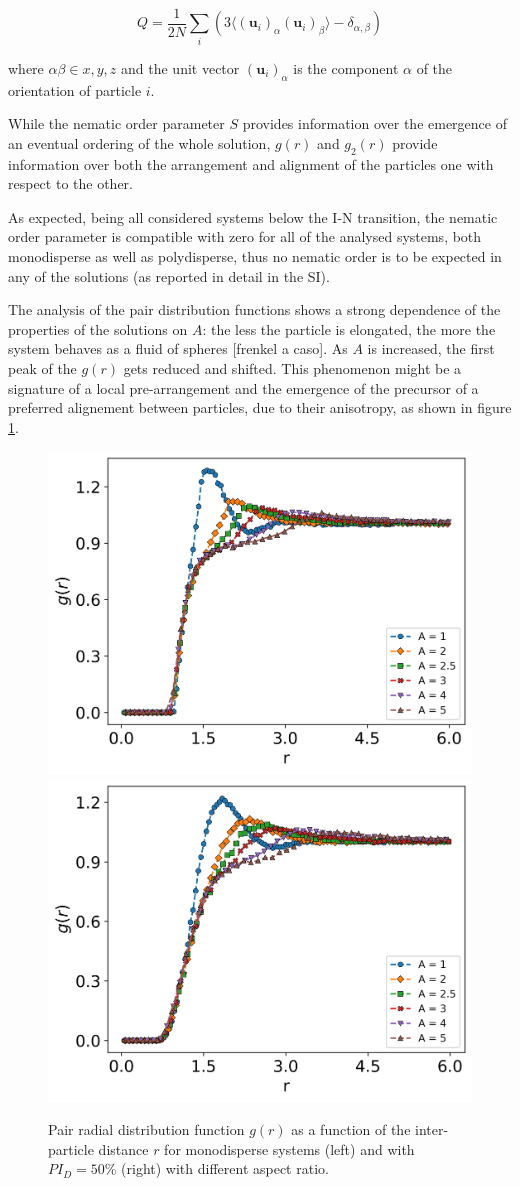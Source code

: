 \documentclass[journal=jacsat,manuscript=article]{achemso}
\begin{document}
$$Q = \frac{1}{2 N} \sum_i \left( 3 \langle (\textbf{u}_i)_\alpha (\textbf{u}_i)_\beta \rangle - \delta_{\alpha, \beta} \right)$$

where $\alpha \beta \in {x, y, z}$ and the unit vector $(\textbf{u}_i)_\alpha$ is the component $\alpha$ of the orientation of particle $i$.

While the nematic order parameter $S$ provides information over the emergence of an eventual ordering of the whole solution, $g(r)$ and $g_2(r)$ provide information over both the  arrangement and  alignment of the particles one with respect to the other. 

As expected, being all considered systems below the I-N transition, the nematic order parameter  is compatible with zero for all of the analysed systems, both monodisperse as well as polydisperse, thus no nematic order is to be expected in any of the solutions (as reported in detail in the SI).


The analysis of the pair distribution functions shows a strong dependence  of the properties of the solutions on $A$: the less the particle is elongated, the more the system behaves as a fluid of spheres [frenkel a caso]. As $A$ is increased, the first peak of the $g(r)$ gets reduced and shifted. This phenomenon might be a signature of a local pre-arrangement and the emergence of  the precursor of a preferred alignement between particles, due to their anisotropy, as shown in figure \ref{fig:G_Monodisperse}. 

\begin{figure}[!h]
    \centering
    \includegraphics[width=0.45 \columnwidth]{Figures/G_mono.png}
    \includegraphics[width=0.45 \columnwidth]{Figures/G_polyD.png}
    \caption{Pair radial distribution function $g(r)$ as a function of the inter-particle distance $r$ for monodisperse systems (left) and with $PI_D = 50 \%$ (right) with different aspect ratio.}
    \label{fig:G_Monodisperse}
\end{figure}
\end{document}
